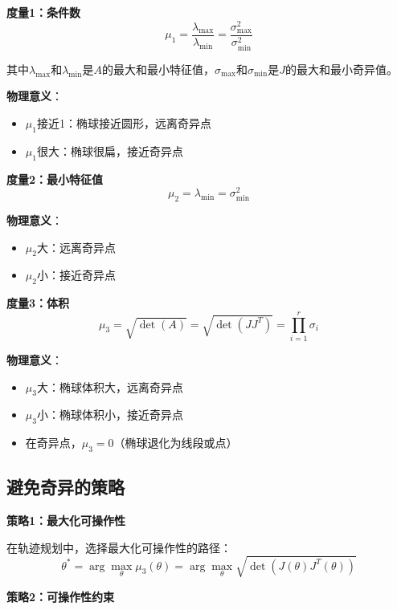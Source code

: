 \documentclass[12pt,a4paper]{article}
\begin{document}
\textbf{度量1：条件数}
\begin{equation}
\mu_1 = \frac{\lambda_{\max}}{\lambda_{\min}} = \frac{\sigma_{\max}^2}{\sigma_{\min}^2}
\end{equation}

其中$\lambda_{\max}$和$\lambda_{\min}$是$A$的最大和最小特征值，$\sigma_{\max}$和$\sigma_{\min}$是$J$的最大和最小奇异值。

\textbf{物理意义}：
\begin{itemize}
\item $\mu_1$接近1：椭球接近圆形，远离奇异点
\item $\mu_1$很大：椭球很扁，接近奇异点
\end{itemize}

\textbf{度量2：最小特征值}
\begin{equation}
\mu_2 = \lambda_{\min} = \sigma_{\min}^2
\end{equation}

\textbf{物理意义}：
\begin{itemize}
\item $\mu_2$大：远离奇异点
\item $\mu_2$小：接近奇异点
\end{itemize}

\textbf{度量3：体积}
\begin{equation}
\mu_3 = \sqrt{\det(A)} = \sqrt{\det(JJ^T)} = \prod_{i=1}^r \sigma_i
\end{equation}

\textbf{物理意义}：
\begin{itemize}
\item $\mu_3$大：椭球体积大，远离奇异点
\item $\mu_3$小：椭球体积小，接近奇异点
\item 在奇异点，$\mu_3 = 0$（椭球退化为线段或点）
\end{itemize}

\subsection{避免奇异的策略}

\textbf{策略1：最大化可操作性}

在轨迹规划中，选择最大化可操作性的路径：
\begin{equation}
\theta^* = \arg\max_{\theta} \mu_3(\theta) = \arg\max_{\theta} \sqrt{\det(J(\theta)J^T(\theta))}
\end{equation}

\textbf{策略2：可操作性约束}
\end{document}
